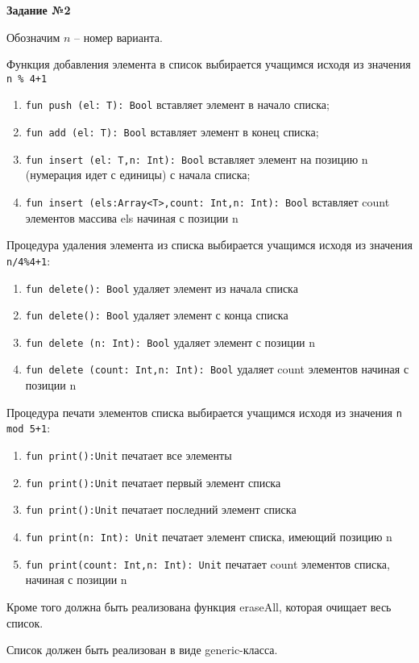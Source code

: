 \textbf{Задание №2}


Обозначим $n$ -- номер варианта.

Функция добавления элемента в список выбирается учащимся исходя из значения \verb|n % 4+1|

\begin{enumerate}
\item \verb|fun push (el: T): Bool|
вставляет элемент в начало списка;
\item \verb|fun add (el: T): Bool|
вставляет элемент в конец списка;
\item \verb|fun insert (el: T,n: Int): Bool|
вставляет элемент на позицию n (нумерация идет с единицы) с начала списка;
\item \verb|fun insert (els:Array<T>,count: Int,n: Int): Bool|
вставляет count элементов массива els начиная с позиции n
\end{enumerate}

Процедура удаления элемента из списка выбирается учащимся исходя из значения \verb|n/4%4+1|:

\begin{enumerate}
	\item \verb|fun delete(): Bool| удаляет элемент из начала списка
	\item \verb|fun delete(): Bool| удаляет элемент с конца списка
	\item \verb|fun delete (n: Int): Bool| удаляет элемент с позиции n
	\item \verb|fun delete (count: Int,n: Int): Bool| удаляет count элементов начиная с позиции n
\end{enumerate}

Процедура печати элементов списка выбирается учащимся исходя из значения \verb|n mod 5+1|:

\begin{enumerate}
	\item \verb|fun print():Unit| печатает все элементы
\item \verb|fun print():Unit| печатает первый элемент списка
\item \verb|fun print():Unit| печатает последний элемент списка
\item \verb|fun print(n: Int): Unit| печатает элемент списка, имеющий позицию n
\item \verb|fun print(count: Int,n: Int): Unit| печатает count элементов списка, начиная с позиции n
\end{enumerate}

Кроме того должна быть реализована функция eraseAll, которая очищает весь список.

Список должен быть реализован в виде generic-класса.

